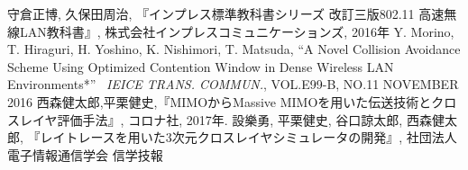 \documentclass[a4paper, 10pt]{ltjsarticle}
\begin{document}


\begin{thebibliography}{9}
  守倉正博, 久保田周治, 『インプレス標準教科書シリーズ 改訂三版802.11 高速無線LAN教科書』, 株式会社インプレスコミュニケーションズ, 2016年
  Y. Morino, T. Hiraguri, H. Yoshino, K. Nishimori, T. Matsuda, ``A Novel Collision Avoidance Scheme Using Optimized Contention Window in Dense Wireless LAN Environments*'' \, \textit{IEICE TRANS. COMMUN.}, VOL.E99-B, NO.11 NOVEMBER 2016
  西森健太郎,平栗健史,『MIMOからMassive MIMOを用いた伝送技術とクロスレイヤ評価手法』, コロナ社, 2017年.
  設樂勇, 平栗健史, 谷口諒太郎, 西森健太郎, 『レイトレースを用いた3次元クロスレイヤシミュレータの開発』, 社団法人 電子情報通信学会 信学技報
\end{thebibliography}
\end{document}

